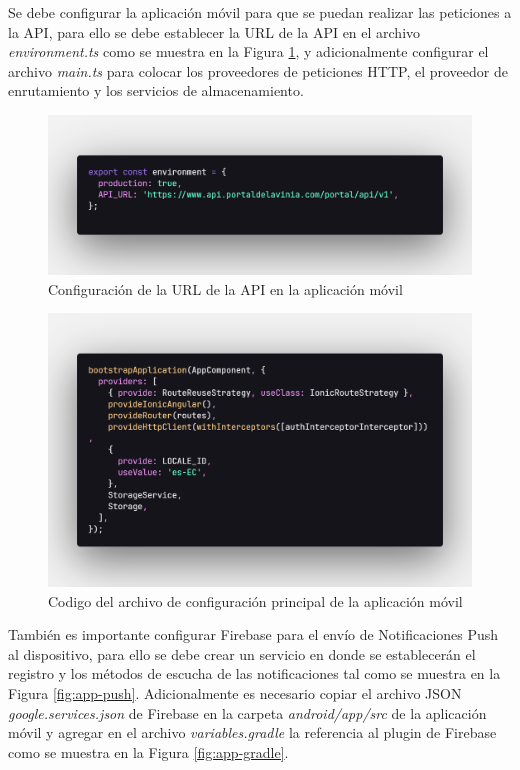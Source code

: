 Se debe configurar la aplicación móvil para que se puedan realizar las peticiones a la API, para ello se debe establecer la URL de la API en el archivo \textit{environment.ts} como se muestra en la Figura \ref{fig:app-environment}, y adicionalmente configurar el archivo \textit{main.ts} para colocar los proveedores de peticiones HTTP, el proveedor de enrutamiento y los servicios de almacenamiento.

\begin{figure}[H]
    \centering
    \includegraphics[width=1\textwidth]{resources/images/app-env}
    \caption{Configuración de la URL de la API en la aplicación móvil}
    \label{fig:app-environment}
\end{figure}

\begin{figure}[H]
    \centering
    \includegraphics[width=1\textwidth]{resources/images/app-main}
    \caption{Codigo del archivo de configuración principal de la aplicación móvil}
    \label{fig:app-main}
\end{figure}

También es importante configurar Firebase para el envío de Notificaciones Push al dispositivo, para ello se debe crear un servicio en donde se establecerán el registro y los métodos de escucha de las notificaciones tal como se muestra en la Figura \ref{fig:app-push}.
Adicionalmente es necesario copiar el archivo JSON \textit{google.services.json} de Firebase en la carpeta \textit{android/app/src} de la aplicación móvil y agregar en el archivo \textit{variables.gradle} la referencia al plugin de Firebase como se muestra en la Figura \ref{fig:app-gradle}.

